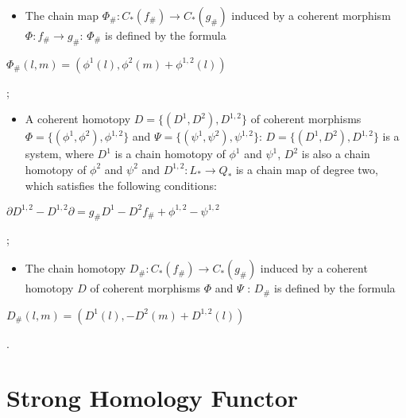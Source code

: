 \documentclass[10pt]{article}
\theoremstyle{definition}
\begin{document}
\begin{itemize}
\item The chain map $\Phi _{\#}:C_{*}( f_{\#})\to C_{*}(g_{\#})$ induced by a coherent morphism $\Phi : f_{\#}\to g_{\#}$: $\Phi _{\#}$ is defined by the formula
\end{itemize}
\begin{center} $\Phi _{\#}(l,m)=(\phi ^{1}(l),\phi ^{2}(m)+\phi ^{1,2}(l) )$
\end{center}

\cite{1901};

\begin{itemize}
\item A coherent homotopy $D=\lbrace (D^{1},D^{2}),D^{1,2}\rbrace $ of
coherent morphisms $\Phi =\lbrace (\phi ^{1},\phi ^{2}),\phi
^{1,2}\rbrace $ and $\Psi =\lbrace (\psi ^{1},\psi ^{2}),\psi
^{1,2}\rbrace $: $D=\lbrace (D^{1},D^{2}),D^{1,2}\rbrace $ is a system,
where $D^{1}$ is a chain homotopy of $\phi ^{1}$ and $\psi ^{1}$, $
D^{2}$ is also a chain homotopy of $\phi ^{2}$ and $\psi ^{2}$ and $
D^{1,2}:L_{*}\to Q_{*}$ is a chain map of degree two, which satisfies the
following conditions:
\end{itemize}
\begin{center}$\partial D^{1,2}-D^{1,2}\partial =g_{\#}D^{1}-D^{2}f_{\#}+\phi ^{1,2}-\psi
^{1,2}$\\
\end{center}

\cite{1901};

\begin{itemize}
\item The chain homotopy $D_{\#}:C_{*}( f_{\#})\to C_{*}(g_{\#})$ induced by a coherent homotopy $D$ of coherent morphisms $\Phi $ and $\Psi $
: $D_{\#}$ is defined by the formula
\end{itemize}
\begin{center}$D_{\#}(l,m)=(D^{1}(l),-D^{2}(m)+D^{1,2}(l) )$
\end{center} 

\cite{1901}.


\section{Strong Homology Functor}

\ \
\end{document}
